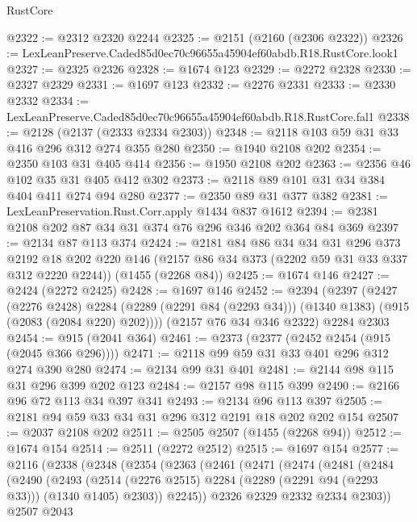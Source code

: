 \begin{lexlean}{RustCore}
\begin{coremodule}
@2322 := @2312 @2320 @2244
@2325 := @2151 (@2160 (@2306 @2322))
@2326 := LexLeanPreserve.Caded85d0ec70c96655a45904ef60abdb.R18.RustCore.look1
@2327 := @2325 @2326
@2328 := @1674 @123
@2329 := @2272 @2328
@2330 := @2327 @2329
@2331 := @1697 @123
@2332 := @2276 @2331
@2333 := @2330 @2332
@2334 := LexLeanPreserve.Caded85d0ec70c96655a45904ef60abdb.R18.RustCore.fal1
@2338 := @2128 (@2137 (@2333 @2334 @2303))
@2348 := @2118 @103 @59 @31 @33 @416 @296 @312 @274 @355 @280
@2350 := @1940 @2108 @202
@2354 := @2350 @103 @31 @405 @414
@2356 := @1950 @2108 @202
@2363 := @2356 @46 @102 @35 @31 @405 @412 @302
@2373 := @2118 @89 @101 @31 @34 @384 @404 @411 @274 @94 @280
@2377 := @2350 @89 @31 @377 @382
@2381 := LexLeanPreservation.Rust.Corr.apply @1434 @837 @1612
@2394 := @2381 @2108 @202 @87 @34 @31 @374 @76 @296 @346 @202 @364 @84 @369
@2397 := @2134 @87 @113 @374
@2424 := @2181
    @84
    @86
    @34
    @34
    @31
    @296
    @373
    @2192
    @18
    @202
    @220
    @146
    (@2157 @86 @34 @373 (@2202 @59 @31 @33 @337 @312 @2220 @2244))
    (@1455 (@2268 @84))
@2425 := @1674 @146
@2427 := @2424 (@2272 @2425)
@2428 := @1697 @146
@2452 := @2394
    (@2397
      (@2427
        (@2276 @2428)
        @2284
        (@2289 (@2291 @84 (@2293 @34)))
        (@1340 @1383)
        (@915 (@2083 (@2084 @220) @202))))
    (@2157 @76 @34 @346 @2322)
    @2284
    @2303
@2454 := @915 (@2041 @364)
@2461 := @2373 (@2377 (@2452 @2454 (@915 (@2045 @366 @296))))
@2471 := @2118 @99 @59 @31 @33 @401 @296 @312 @274 @390 @280
@2474 := @2134 @99 @31 @401
@2481 := @2144 @98 @115 @31 @296 @399 @202 @123
@2484 := @2157 @98 @115 @399
@2490 := @2166 @96 @72 @113 @34 @397 @341
@2493 := @2134 @96 @113 @397
@2505 := @2181 @94 @59 @33 @34 @31 @296 @312 @2191 @18 @202 @202 @154
@2507 := @2037 @2108 @202
@2511 := @2505 @2507 (@1455 (@2268 @94))
@2512 := @1674 @154
@2514 := @2511 (@2272 @2512)
@2515 := @1697 @154
@2577 := @2116
    (@2338
      (@2348
        (@2354
          (@2363
            (@2461
              (@2471
                (@2474
                  (@2481
                    (@2484
                      (@2490
                        (@2493
                          (@2514
                            (@2276 @2515)
                            @2284
                            (@2289 (@2291 @94 (@2293 @33)))
                            (@1340 @1405)
                            @2303))
                        @2245))
                    @2326
                    @2329
                    @2332
                    @2334
                    @2303))
                @2507
                @2043

\end{coremodule}
\end{lexlean}

